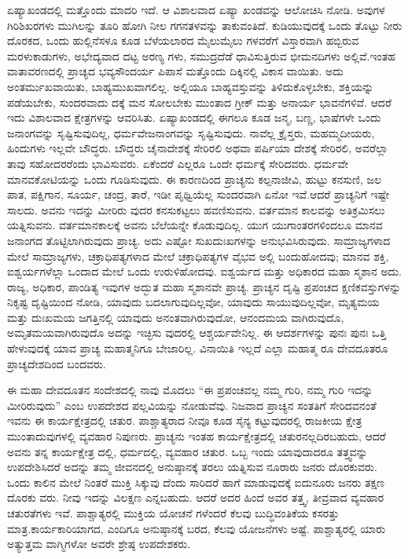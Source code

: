 ಏಷ್ಯಾಖಂಡದಲ್ಲಿ ಮತ್ತೊಂದು ಮಾದರಿ ಇದೆ. ಆ ವಿಶಾಲವಾದ ಏಷ್ಯಾ ಖಂಡವನ್ನು ಆಲೋಚಿಸಿ ನೋಡಿ. ಅವುಗಳ ಗಿರಿಶಿಖರಗಳು ಮುಗಿಲನ್ನು ತೂರಿ ಹೋಗಿ ನೀಲ ಗಗನತಳವನ್ನು ತಾಕುವಂತಿದೆ. ಕುಡಿಯುವುದಕ್ಕೆ ಒಂದು ತೊಟ್ಟು ನೀರು ದೊರಕದ, ಒಂದು ಹುಲ್ಲಿನೆಸಳೂ ಕೂಡ ಬೆಳೆಯಲಾರದ ಮೈಲುಮೈಲು ಗಳವರೆಗೆ ವಿಸ್ತಾರವಾಗಿ ಹಬ್ಬಿರುವ ಮರಳುಕಾಡುಗಳು, ಅಭೇದ್ಯವಾದ ದಟ್ಟ ಅರಣ್ಯ ಗಳು, ಸಮುದ್ರದೆಡೆ ಧಾವಿಸುತ್ತಿರುವ ಭೀಮನದಿಗಳು ಅಲ್ಲಿವೆ.ಇಂತಹ ವಾತಾವರಣದಲ್ಲಿ ಪ್ರಾಚ್ಯದ ಭವ್ಯಸೌಂದರ್ಯ ಪಿಪಾಸೆ ಮತ್ತೊಂದು ದಿಕ್ಕಿನಲ್ಲಿ ವಿಕಾಸ ವಾಯಿತು. ಅದು ಅಂತರ್ಮುಖವಾಯಿತು, ಬಾಹ್ಯಮುಖವಾಗಲಿಲ್ಲ. ಅಲ್ಲಿಯೂ ಬಾಹ್ಯವಸ್ತುವನ್ನು ತಿಳಿದುಕೊಳ್ಳಬೇಕು, ಶಕ್ತಿಯನ್ನು ಪಡೆಯಬೇಕು, ಸುಂದರವಾದು ದಕ್ಕೆ ಮನ ಸೋಲಬೇಕು ಮುಂತಾದ ಗ್ರೀಕ್​ ಮತ್ತು ಅನಾರ್ಯ ಭಾವನೆಗಳಿವೆ. ಆದರೆ ಇದು ವಿಶಾಲವಾದ ಕ್ಷೇತ್ರಗಳನ್ನು ಆವರಿಸಿತು. ಏಷ್ಯಾಖಂಡದಲ್ಲಿ ಈಗಲೂ ಕೂಡ ಜನ್ಮ, ಬಣ್ಣ, ಭಾಷೆಗಳೇ ಒಂದು ಜನಾಂಗವನ್ನು ಸೃಷ್ಟಿಸುವುದಿಲ್ಲ, ಧರ್ಮವೇಜನಾಂಗವನ್ನು ಸೃಷ್ಟಿಸುವುದು. ನಾವೆಲ್ಲ ಕ್ರೈಸ್ತರು, ಮಹಮ್ಮದೀಯರು, ಹಿಂದುಗಳು ಇಲ್ಲವೇ ಬೌದ್ಧರು. ಬೌದ್ಧರು ಚೈನಾದೇಶಕ್ಕೆ ಸೇರಿರಲಿ ಅಥವಾ ಪರ್ಷಿಯಾ ದೇಶಕ್ಕೆ ಸೇರಿರಲಿ, ಅವರೆಲ್ಲಾ ತಾವು ಸಹೋದರರೆಂದು ಭಾವಿಸುವರು. ಏಕೆಂದರೆ ಎಲ್ಲರೂ ಒಂದೇ ಧರ್ಮಕ್ಕೆ ಸೇರಿದವರು. ಧರ್ಮವೇ ಮಾನವಕೋಟಿಯನ್ನು ಒಂದು ಗೂಡಿಸುವುದು. ಈ ಕಾರಣದಿಂದ ಪ್ರಾಚ್ಯನು ಕಲ್ಪನಾಜೀವಿ, ಹುಟ್ಟು ಕನಸುಣಿ, ಜಲ ಪಾತ, ಪಕ್ಷಿಗಾನ, ಸೂರ್ಯ, ಚಂದ್ರ, ತಾರೆ, ಇಡೀ ಪೃಥ್ವಿಯೆಲ್ಲ ಸುಂದರವಾಗಿ ಏನೋ ಇವೆ.ಆದರೆ ಪ್ರಾಚ್ಯನಿಗೆ ಇಷ್ಟೇ ಸಾಲದು. ಅವನು ಇದನ್ನು ಮೀರಿರು ವುದರ ಕನಸುಕಟ್ಟಲು ಹವಣಿಸುವನು. ವರ್ತಮಾನ ಕಾಲವನ್ನು ಅತಿಕ್ರಮಿಸಲು ಯತ್ನಿಸುವನು. ವರ್ತಮಾನಕಾಲಕ್ಕೆ ಅವನು ಬೆಲೆಯನ್ನೇ ಕೊಡುವುದಿಲ್ಲ. ಯುಗ ಯುಗಾಂತರಗಳಿಂದಲೂ ಮಾನವ ಜನಾಂಗದ ತೊಟ್ಟಿಲಾಗಿರುವುದು ಪ್ರಾಚ್ಯ. ಅದು ಎಷ್ಟೋ ಸುಖದುಃಖಗಳನ್ನು ಅನುಭವಿಸಿರುವುದು. ಸಾಮ್ರಾಜ್ಯಗಳಾದ ಮೇಲೆ ಸಾಮ್ರಾಜ್ಯಗಳು, ಚಕ್ರಾಧಿಪತ್ಯಗಳಾದ ಮೇಲೆ ಚಕ್ರಾಧಿಪತ್ಯಗಳ ವೈಭವ ಅಲ್ಲಿ ಬಂದುಹೋದವು; ಮಾನವ ಶಕ್ತಿ, ಐಶ್ವರ್ಯಗಳೆಲ್ಲಾ ಒಂದಾದ ಮೇಲೆ ಒಂದು ಉರುಳಿಹೋದವು. ಐಶ್ವರ್ಯದ ಮತ್ತು ಅಧಿಕಾರದ ಮಹಾ ಸ್ಮಶಾನ ಅದು. ರಾಜ್ಯ, ಅಧಿಕಾರ, ಪಾಂಡಿತ್ಯ ಇವುಗಳ ಅದ್ಭುತ ಮಹಾ ಸ್ಮಶಾನವೇ ಪ್ರಾಚ್ಯ. ಪ್ರಾಚ್ಯನ ದೃಷ್ಟಿ ಪ್ರಪಂಚದ ಕ್ಷಣಿಕವಸ್ತುಗಳನ್ನು ನಿಕೃಷ್ಟ ದೃಷ್ಟಿಯಿಂದ ನೋಡಿ, ಯಾವುದು ಬದಲಾಗುವುದಿಲ್ಲವೋ, ಯಾವುದು ಸಾಯುವುದಿಲ್ಲವೋ, ಮೃತ್ಯಮಯ ಮತ್ತು ದುಃಖಮಯ ಜಗತ್ತಿನಲ್ಲಿ ಯಾವುದು ಅನಂತವಾಗಿರುವುದೋ, ಆನಂದಮಯ ವಾಗಿರುವುದೊ, ಅಮೃತಮಯವಾಗಿರುವುದೊ ಅದನ್ನು ಇಚ್ಛಿಸು ವುದರಲ್ಲಿ ಆಶ್ಚರ್ಯವೇನಿಲ್ಲ. ಈ ಆದರ್ಶಗಳನ್ನು ಪುನಃ ಪುನಃ ಒತ್ತಿ ಹೇಳುವುದಕ್ಕೆ ಯಾವ ಪ್ರಾಚ್ಯ ಮಹಾತ್ಮನಿಗೂ ಬೇಜಾರಿಲ್ಲ. ವಿನಾಯಿತಿ ಇಲ್ಲದೆ ಎಲ್ಲಾ ಮಹಾತ್ಮ ರೂ ದೇವದೂತರೂ ಪ್ರಾಚ್ಯದೇಶದಿಂದ ಬಂದವರು.

ಈ ಮಹಾ ದೇವದೂತನ ಸಂದೇಶದಲ್ಲಿ ನಾವು ಮೊದಲು “ಈ ಪ್ರಪಂಚವಲ್ಲ ನಮ್ಮ ಗುರಿ, ನಮ್ಮ ಗುರಿ ಇದನ್ನು ಮೀರಿರುವುದು” ಎಂಬ ಉಪದೇಶದ ಪಲ್ಲವಿಯನ್ನು ನೋಡುವೆವು. ನಿಜವಾದ ಪ್ರಾಚ್ಯನ ಸಂತತಿಗೆ ಸೇರಿದವನಂತೆ ಇವನು ಈ ಕಾರ್ಯಕ್ಷೇತ್ರದಲ್ಲಿ ಚತುರ. ಪಾಶ್ಚಾತ್ಯರಾದ ನೀವೂ ಕೂಡ ಸೈನ್ಯ ಕಟ್ಟುವುದರಲ್ಲಿ ರಾಜಕೀಯ ಕ್ಷೇತ್ರ ಮುಂತಾದುವು\-ಗಳಲ್ಲಿ ವ್ಯವಹಾರ ನಿಪುಣರು. ಪ್ರಾಚ್ಯನು ಇಂತಹ ಕಾರ್ಯಕ್ಷೇತ್ರದಲ್ಲಿ ಚತುರನಲ್ಲದಿರಬಹುದು, ಆದರೆ ಅವನು ತನ್ನ ಕಾರ್ಯಕ್ಷೇತ್ರ ದಲ್ಲಿ, ಧರ್ಮದಲ್ಲಿ, ವ್ಯವಹಾರ ಚತುರ. ಒಬ್ಬ ಇಂದು ಯಾವುದಾದರೂ ತತ್ತ್ವವನ್ನು ಉಪದೇಶಿಸಿದರೆ ಅದನ್ನು ತಮ್ಮ ಜೀವನದಲ್ಲಿ ಅನುಷ್ಠಾನಕ್ಕೆ ತರಲು ಯತ್ನಿಸುವ ನೂರಾರು ಜನರು ದೊರಕುವರು. ಒಂದು ಕಾಲಿನ ಮೇಲೆ ನಿಂತರೆ ಮುಕ್ತಿ ಸಿಕ್ಕುವು ದೆಂದು ಸಾರಿದರೆ ಹಾಗೆ ಮಾಡುವುದಕ್ಕೆ ಐದುನೂರು ಜನರು ತಕ್ಷಣ ದೊರಕು ವರು. ನೀವು ಇದನ್ನು ವಿಲಕ್ಷಣ ಎನ್ನಬಹುದು. ಆದರೆ ಅದರ ಹಿಂದೆ ಅವರ ತತ್ತ್ವ, ತೀವ್ರವಾದ ವ್ಯವಹಾರ ಚತುರತೆಗಳು ಇವೆ. ಪಾಶ್ಚಾತ್ಯರಲ್ಲಿ ಮುಕ್ತಿಯ ಯೋಚನೆ ಗಳೆಂದರೆ ಕೆಲವು ಬುದ್ಧಿವಂತಿಕೆಯ ಕಸರತ್ತು ಮಾತ್ರ.ಕಾರ್ಯಕಾರಿಯಾಗದ, ಎಂದಿಗೂ ಅನುಷ್ಠಾನಕ್ಕೆ ಬರದ, ಕೆಲವು ಯೋಜನೆಗಳು ಅಷ್ಟೆ. ಪಾಶ್ಚಾತ್ಯರಲ್ಲಿ ಯಾರು ಅತ್ಯುತ್ತಮ ವಾಗ್ಮಿಗಳೋ ಅವರೇ ಶ್ರೇಷ್ಠ ಉಪದೇಶಕರು.


